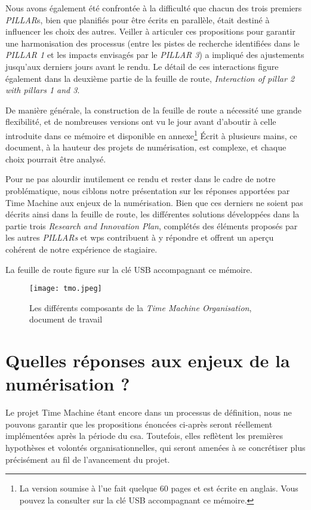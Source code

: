 Nous avons également été confrontée à la difficulté que chacun des trois premiers \textit{PILLAR}s, bien que planifiés pour être écrits en parallèle, était destiné à influencer les choix des autres. Veiller à articuler ces propositions pour garantir une harmonisation des processus (entre les pistes de recherche identifiées dans le \textit{PILLAR 1} et les impacts envisagés par le \textit{PILLAR 3}) a impliqué des ajustements jusqu'aux derniers jours avant le rendu. Le détail de ces interactions figure également dans la deuxième partie de la feuille de route, \textit{Interaction of pillar 2 with pillars 1 and 3}. 

De manière générale, la construction de la feuille de route a nécessité une grande flexibilité, et de nombreuses versions ont vu le jour avant d'aboutir à celle introduite dans ce mémoire et disponible en annexe\footnote{La version soumise à l'\gls{ue} fait quelque 60 pages et est écrite en anglais. Vous pouvez la consulter sur la clé USB accompagnant ce mémoire.} Écrit à plusieurs mains, ce document, à la hauteur des projets de numérisation, est complexe, et chaque choix pourrait être analysé. 

Pour ne pas alourdir inutilement ce rendu et rester dans le cadre de notre problématique, nous ciblons notre présentation sur les réponses apportées par Time Machine aux enjeux de la numérisation. Bien que ces derniers ne soient pas décrits ainsi dans la feuille de route, les différentes solutions développées dans la partie trois \textit{Research and Innovation Plan}, complétés des éléments proposés par les autres \textit{PILLARs} et \gls{wp}s contribuent à y répondre et offrent un aperçu cohérent de notre expérience de stagiaire. 

La feuille de route figure sur la clé USB accompagnant ce mémoire.

\begin{figure}[ht]%
\texttt{[image: tmo.jpeg]}
\caption{Les différents composants de la \textit{Time Machine Organisation}, document de travail}
\end{figure}

\chapter{Quelles réponses aux enjeux de la numérisation ?}

Le projet Time Machine étant encore dans un processus de définition, nous ne pouvons garantir que les propositions énoncées ci-après seront réellement implémentées après la période du \gls{csa}. Toutefois, elles reflètent les premières hypothèses et volontés organisationnelles, qui seront amenées à se concrétiser plus précisément au fil de l'avancement du projet.

